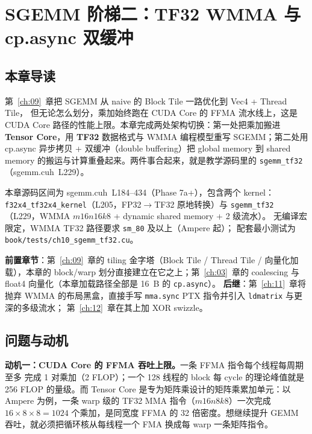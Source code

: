 \chapter{SGEMM 阶梯二：TF32 WMMA 与 cp.async 双缓冲}\label{ch:10}

\section{本章导读}

第~\ref{ch:09}~章把 SGEMM 从 naive 的 Block Tile 一路优化到 Vec4 + Thread Tile，
但无论怎么划分，乘加始终跑在 CUDA Core 的 FFMA 流水线上，这是 CUDA Core
路径的性能上限。本章完成两处架构切换：第一处把乘加搬进
\textbf{Tensor Core}，用 \textbf{TF32} 数据格式与 WMMA 编程模型重写
SGEMM；第二处用 cp.async 异步拷贝 + 双缓冲（double buffering）把 global
memory 到 shared memory 的搬运与计算重叠起来。两件事合起来，就是教学源码里的
\texttt{sgemm\_tf32}（sgemm.cuh~L229）。

本章源码区间为 sgemm.cuh~L184--434（Phase 7a+），包含两个 kernel：
\texttt{f32x4\_\allowbreak{}tf32x4\_\allowbreak{}kernel}（L205，FP32$\to$TF32 原地转换）与
\texttt{sgemm\_tf32}（L229，WMMA $m16n16k8$ + dynamic shared memory + 2 级流水）。
无编译宏限定，WMMA TF32 路径要求 \texttt{sm\_80} 及以上（Ampere 起）；
配套最小测试为 \texttt{book/\allowbreak{}tests/\allowbreak{}ch10\_\allowbreak{}sgemm\_\allowbreak{}tf32.cu}。

\textbf{前置章节}：第~\ref{ch:09}~章的 tiling 金字塔（Block Tile / Thread Tile /
向量化加载），本章的 block/warp 划分直接建立在它之上；第~\ref{ch:03}~章的
coalescing 与 float4 向量化（本章加载路径全部是 16~B 的 \texttt{cp.async}）。
\textbf{后继}：第~\ref{ch:11}~章将抛弃 WMMA 的布局黑盒，直接手写
\texttt{mma.sync} PTX 指令并引入 \texttt{ldmatrix} 与更深的多级流水；
第~\ref{ch:12}~章在其上加 XOR swizzle。

\section{问题与动机}

\textbf{动机一：CUDA Core 的 FFMA 吞吐上限。}一条 FFMA 指令每个线程每周期至多
完成 1 对乘加（2 FLOP）；一个 128 线程的 block 每 cycle 的理论峰值就是
256 FLOP 的量级。而 Tensor Core 是专为矩阵乘设计的矩阵乘累加单元：以
Ampere 为例，一条 warp 级的 TF32 MMA 指令（$m16n8k8$）一次完成
$16\times 8\times 8 = 1024$ 个乘加，是同宽度 FFMA 的 32 倍密度。想继续提升
GEMM 吞吐，就必须把循环核从每线程一个 FMA 换成每 warp 一条矩阵指令。

